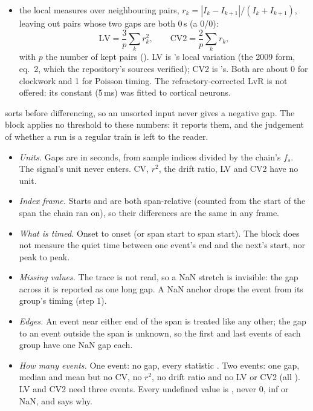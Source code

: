 \begin{enumerate}
\begin{itemize}
    widen;
  \item the local measures over neighbouring pairs, $r_k = |I_k - I_{k+1}|/(I_k + I_{k+1})$,
    leaving out pairs whose two gaps are both 0\,s (a 0/0):
    \[ \mathrm{LV} = \frac{3}{p}\sum_{k} r_k^2 , \qquad
       \mathrm{CV2} = \frac{2}{p}\sum_{k} r_k , \]
    with $p$ the number of kept pairs (). LV is
    \citet{shinomoto2003differences}'s local variation (the 2009 form, eq.~2, which the
    repository's sources verified); CV2 is \citet{holt1996comparison}'s. Both are about 0
    for clockwork and 1 for Poisson timing. The refractory-corrected LvR is not offered: its
    constant (5\,ms) was fitted to cortical neurons.
  \end{itemize}
\end{enumerate}

 sorts before differencing, so an unsorted input never gives a
negative gap. The block applies no threshold to these numbers: it reports them, and the
judgement of whether a run is a regular train is left to the reader.

\begin{itemize}
\item \emph{Units.} Gaps are in seconds, from sample indices divided by the chain's $f_s$.
  The signal's unit never enters. CV, $r^2$, the drift ratio, LV and CV2 have no unit.
\item \emph{Index frame.} Starts and  are both span-relative (counted from
  the start of the span the chain ran on), so their differences are the same in any frame.
\item \emph{What is timed.} Onset to onset (or span start to span start). The block does
  not measure the quiet time between one event's end and the next's start, nor peak to
  peak.
\item \emph{Missing values.} The trace is not read, so a NaN stretch is invisible: the gap
  across it is reported as one long gap. A NaN anchor drops the event from its group's
  timing (step 1).
\item \emph{Edges.} An event near either end of the span is treated like any other; the gap
  to an event outside the span is unknown, so the first and last events of each group have
  one NaN gap each.
\item \emph{How many events.} One event: no gap, every statistic . Two events:
  one gap, median and mean but no CV, no $r^2$, no drift ratio and no LV or CV2 (all
  ). LV and CV2 need three events. Every undefined value is , never 0, inf or
  NaN, and  says why.
\end{itemize}

